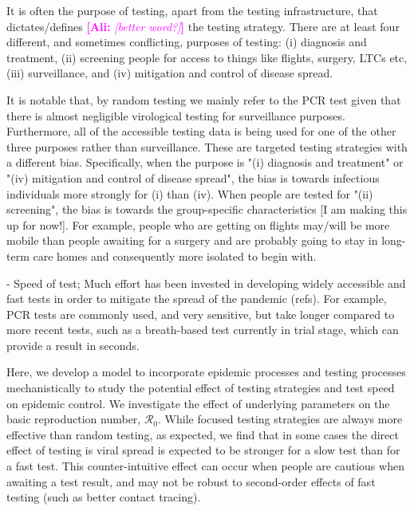 \documentclass[12pt]{article}
\newcommand{\comment}{\showcomment}
\newcommand{\showcomment}[3]{\textcolor{#1}{\textbf{[#2: }\textsl{#3}\textbf{]}}}
\newcommand{\ali}[1]{\comment{magenta}{Ali}{#1}}
\newcommand{\bmb}[1]{\comment{red}{BMB}{#1}}
\newcommand{\Rnum}{\mathcal{R}_0}
\theoremstyle{definition} %
\begin{document}

It is often the purpose of testing, apart from the testing infrastructure, that dictates/defines \ali{[better word?]} the testing strategy. There are at least four different, and sometimes conflicting, purposes of testing: (i) diagnosis and treatment, (ii) screening people for access to things like flights, surgery, LTCs etc, (iii) surveillance, and (iv) mitigation and control of disease spread.
  
It is notable that, by random testing we mainly refer to the PCR test given that there is almost negligible virological testing for surveillance purposes. Furthermore, all of the accessible testing data is being used for one of the other three purposes rather than surveillance. These are targeted testing strategies with a different bias. Specifically, when the purpose is "(i) diagnosis and treatment" or "(iv) mitigation and control of disease spread", the bias is towards infectious individuals more strongly for (i) than (iv). When people are tested for "(ii) screening", the bias is towards the group-specific characteristics [I am making this up for now!]. For example, people who are getting on flights may/will be more mobile than people awaiting for a surgery and are probably going to stay in long-term care homes and consequently more isolated to begin with.    

- Speed of test; 
Much effort has been invested in developing widely accessible and fast tests in order to mitigate the spread of the pandemic (refs). For example, PCR tests are commonly used, and very sensitive, but take longer compared to more recent tests, such as a breath-based test currently in trial stage, which can provide a result in seconds.

Here, we develop a model to incorporate epidemic processes and testing processes mechanistically to study the potential effect of testing strategies and test speed on epidemic control. We investigate the effect of underlying parameters on the basic reproduction number, $\Rnum$. While focused testing strategies are always more effective than random testing, as expected, we find that in some cases the direct effect of testing is viral spread is expected to be stronger for a slow test than for a fast test. This counter-intuitive effect can occur when people are cautious when awaiting a test result, and may not be robust to second-order effects of fast testing (such as better contact tracing). 
\end{document}
